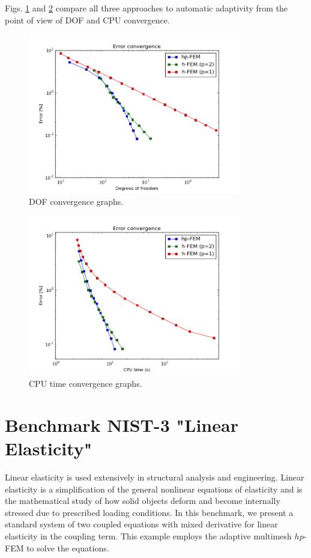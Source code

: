 \documentclass[12pt]{elsarticle}
\begin{document}
Figs. \ref{fig:nist-2-conv-dof} and \ref{fig:nist-2-conv-cpu} compare all
three approaches to automatic adaptivity from the point
of view of DOF and CPU convergence.

\begin{figure}[H]
\centering
\includegraphics[height=7cm]{nist/nist-2/conv_dof_aniso.png}
\caption{DOF convergence graphs.}
\label{fig:nist-2-conv-dof}
\end{figure}

\begin{figure}[H]
\centering
\includegraphics[height=7cm]{nist/nist-2/conv_cpu_aniso.png}
\caption{CPU time convergence graphs.}
\label{fig:nist-2-conv-cpu}
\end{figure}


\section{Benchmark NIST-3 "Linear Elasticity"}
\label{sec:bench-3}

Linear elasticity is used extensively in structural analysis
and engineering. Linear elasticity is a simplification
of the general nonlinear equations of elasticity and is the mathematical
study of how solid objects deform and become internally
stressed due to prescribed loading conditions.
In this benchmark, we present a standard system of two
coupled equations with mixed derivative for linear elasticity
in the coupling term. This example employs the adaptive multimesh $hp$-FEM
to solve the equations.
\end{document}
